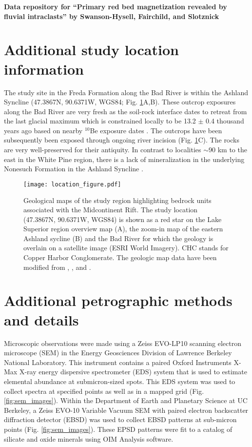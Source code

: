 \documentclass[11pt,letterpaper]{article}
\begin{document}
\begin{flushleft}
{\Large \textbf{Data repository for ``Primary red bed magnetization revealed by fluvial intraclasts'' by Swanson-Hysell, Fairchild, and Slotznick}}

\end{flushleft}

\section*{Additional study location information}
The study site in the Freda Formation along the Bad River is within the Ashland Syncline (47.3867\textdegree N, 90.6371\textdegree W, WGS84; Fig. \ref{fig:location_figure}A,B). These outcrop exposures along the Bad River are very fresh as the soil-rock interface dates to retreat from the last glacial maximum which is constrained locally to be 13.2 $\pm$ 0.4 thousand years ago based on nearby $^{10}$Be exposure dates \citep{Ullman2015a}. The outcrops have been subsequently been exposed through ongoing river incision (Fig. \ref{fig:location_figure}C). The rocks are very well-preserved for their antiquity. In contrast to localities $\sim$90 km to the east in the White Pine region, there is a lack of mineralization in the underlying Nonesuch Formation in the Ashland Syncline \citep{Stewart2017a}. 

\begin{figure}[!ht]
\noindent\texttt{[image: location\_figure.pdf]}
\caption{\small{Geological maps of the study region highlighting bedrock units associated with the Midcontinent Rift. The study location (47.3867\textdegree N, 90.6371\textdegree W, WGS84) is shown as a red star on the Lake Superior region overview map (A), the zoom-in map of the eastern Ashland sycline (B) and the Bad River for which the geology is overlain on a satellite image (ESRI World Imagery). CHC stands for Copper Harbor Conglomerate. The geologic map data have been modified from \cite{Survey2011a}, \cite{Nicholson2004a}, and \cite{Jirsa2011a}.}}
\label{fig:location_figure}
\end{figure} 

\section*{Additional petrographic methods and details}
Microscopic observations were made using a Zeiss EVO-LP10 scanning electron microscope (SEM) in the Energy Geosciences Division of Lawrence Berkeley National Laboratory. This instrument contains a paired Oxford Instruments X-Max X-ray energy dispersive spectrometer (EDS) system that is used to estimate elemental abundance at submicron-sized spots. This EDS system was used to collect spectra at specified points as well as in a mapped grid (Fig. \ref{fig:sem_images}). Within the Department of Earth and Planetary Science at UC Berkeley, a Zeiss EVO-10 Variable Vacuum SEM with paired electron backscatter diffraction detector (EBSD) was used to collect EBSD patterns at sub-micron points (Fig. \ref{fig:sem_images}). These EPSD patterns were fit to a catalog of silicate and oxide minerals using OIM Analysis software.
\end{document}
